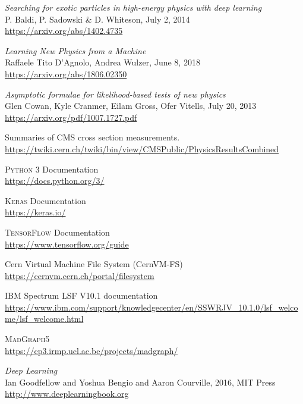 \begin{thebibliography}{99}

    \textit{Searching for exotic particles in high-energy physics with deep learning}
    \\P. Baldi, P. Sadowski \& D. Whiteson, July 2, 2014
    \\\url{https://arxiv.org/abs/1402.4735}

    \textit{Learning New Physics from a Machine}
    \\Raffaele Tito D'Agnolo, Andrea Wulzer, June 8, 2018
    \\\url{https://arxiv.org/abs/1806.02350}

    \textit{Asymptotic formulae for likelihood-based tests of new physics}
    \\Glen Cowan, Kyle Cranmer, Eilam Gross, Ofer Vitells, July 20, 2013
    \\\url{https://arxiv.org/pdf/1007.1727.pdf}

    Summaries of CMS cross section measurements.
    \\\url{https://twiki.cern.ch/twiki/bin/view/CMSPublic/PhysicsResultsCombined}

    \textsc{Python 3} Documentation
    \\\url{https://docs.python.org/3/}

    \textsc{Keras} Documentation 
    \\\url{https://keras.io/}
    
    \textsc{TensorFlow} Documentation 
    \\\url{https://www.tensorflow.org/guide}

    Cern Virtual Machine File System (CernVM-FS)
    \\\url{https://cernvm.cern.ch/portal/filesystem}

    IBM Spectrum LSF V10.1 documentation
    \\\url{https://www.ibm.com/support/knowledgecenter/en/SSWRJV_10.1.0/lsf_welcome/lsf_welcome.html}

    \textsc{MadGraph5}
    \\\url{https://cp3.irmp.ucl.ac.be/projects/madgraph/}
    
    \textit{Deep Learning}
    \\Ian Goodfellow and Yoshua Bengio and Aaron Courville, 2016, MIT Press
    \\\url{http://www.deeplearningbook.org}


\end{thebibliography}
